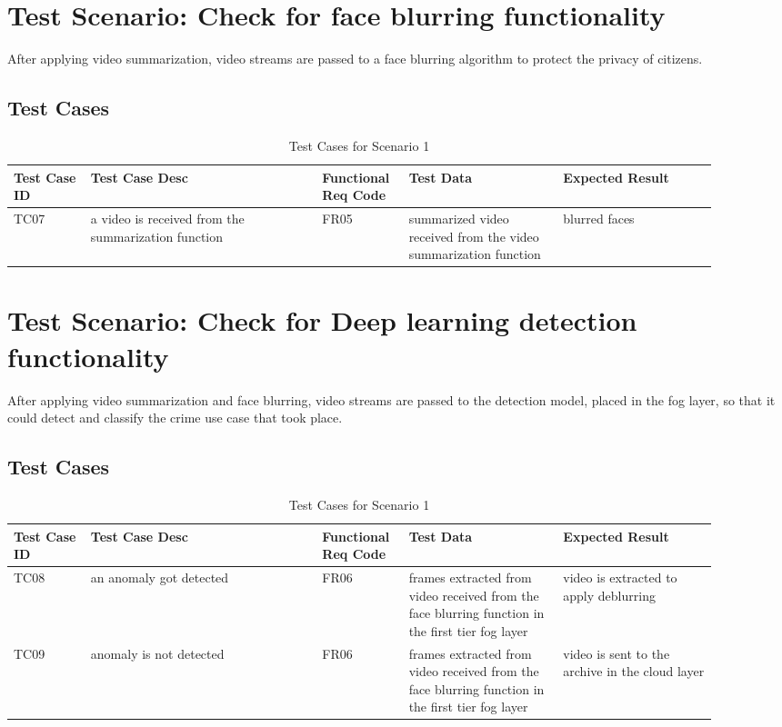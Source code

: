 \documentclass[12pt]{article}
\begin{document}
\newpage
\section{Test Scenario: Check for face blurring functionality}\label{sec:TSy}
After applying video summarization, video streams are passed to a face blurring algorithm to protect the privacy of citizens.
\subsection{Test Cases}
\begin{table}[h]
\caption{Test Cases for Scenario 1}
\label{tab:TC1}
\begin{tabular}{|p{0.1\linewidth}|p{0.3\linewidth}|p{0.1\linewidth}|p{0.2\linewidth}|p{0.2\linewidth}|}
\hline
Test Case ID & Test Case Desc & Functional Req Code & Test Data & Expected Result \\ \hline
TC07  & a video is received from the summarization function & FR05 & summarized video received from the video summarization function    &  blurred faces                \\ \hline

\end{tabular}
\end{table}

\section{Test Scenario: Check for Deep learning detection functionality}\label{sec:TSy}
After applying video summarization and face blurring, video streams are passed to the detection model, placed in the fog layer, so that it could detect and classify the crime use case that took place. 
\subsection{Test Cases}
\begin{table}[h]
\caption{Test Cases for Scenario 1}
\label{tab:TC1}
\begin{tabular}{|p{0.1\linewidth}|p{0.3\linewidth}|p{0.1\linewidth}|p{0.2\linewidth}|p{0.2\linewidth}|}
\hline
Test Case ID & Test Case Desc & Functional Req Code & Test Data & Expected Result \\ \hline
TC08  & an anomaly got detected & FR06 &   frames extracted from video received from the face blurring function in the first tier fog layer   & video is extracted to apply deblurring                \\ \hline
TC09 & anomaly is not detected   & FR06    &  frames extracted from video received from the face blurring function in the first tier fog layer      &  video is sent to the archive in the cloud layer         \\ \hline

\end{tabular}
\end{table}
\newpage
\end{document}
